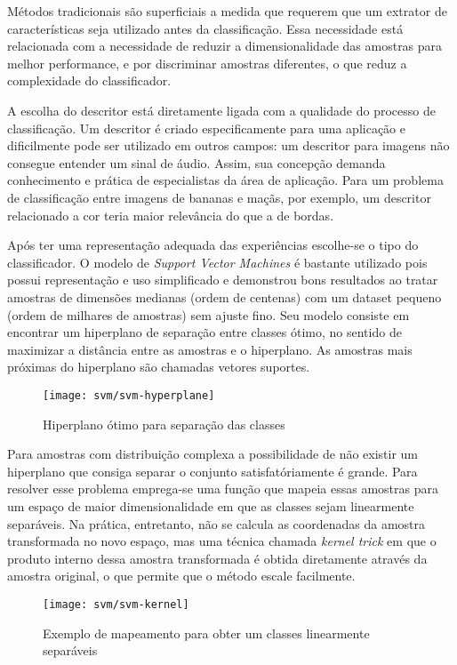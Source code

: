 Métodos tradicionais são superficiais a medida que requerem que um extrator de características seja utilizado antes da classificação. Essa necessidade está relacionada com a necessidade de reduzir a dimensionalidade das amostras para melhor performance, e por discriminar amostras diferentes, o que reduz a complexidade do classificador.

A escolha do descritor está diretamente ligada com a qualidade do processo de classificação. Um descritor é criado especificamente para uma aplicação e dificilmente pode ser utilizado em outros campos: um descritor para imagens não consegue entender um sinal de áudio. Assim, sua concepção demanda conhecimento e prática de especialistas da área de aplicação. Para um problema de classificação entre imagens de bananas e maçãs, por exemplo, um descritor relacionado a cor teria maior relevância do que a de bordas.

Após ter uma representação adequada das experiências escolhe-se o tipo do classificador. O modelo de \textit{Support Vector Machines} é bastante utilizado pois possui representação e uso simplificado e demonstrou bons resultados ao tratar amostras de dimensões medianas (ordem de centenas) com um dataset pequeno (ordem de milhares de amostras) sem ajuste fino. Seu modelo consiste em encontrar um hiperplano de separação entre classes ótimo, no sentido de maximizar a distância entre as amostras e o hiperplano. As amostras mais próximas do hiperplano são chamadas vetores suportes.

\begin{figure}[h]
\caption{Hiperplano ótimo para separação das classes}
\centering
\texttt{[image: svm/svm-hyperplane]}
\label{fig:svm-hyperplane}
\end{figure}

Para amostras com distribuição complexa a possibilidade de não existir um hiperplano que consiga separar o conjunto satisfatóriamente é grande. Para resolver esse problema emprega-se uma função que mapeia essas amostras para um espaço de maior dimensionalidade em que as classes sejam linearmente separáveis. Na prática, entretanto, não se calcula as coordenadas da amostra transformada no novo espaço, mas uma técnica chamada \textit{kernel trick} em que o produto interno dessa amostra transformada é obtida diretamente através da amostra original, o que permite que o método escale facilmente.

\begin{figure}[h]
\caption{Exemplo de mapeamento para obter um classes linearmente separáveis}
\centering
\texttt{[image: svm/svm-kernel]}
\label{fig:svm-kernel}
\end{figure}

